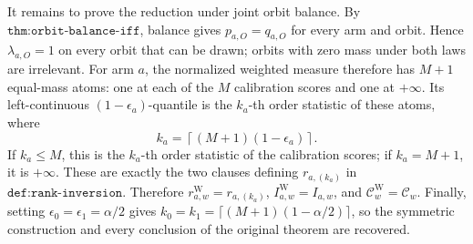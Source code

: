 It remains to prove the reduction under joint orbit balance. By \(\texttt{thm:orbit-balance-iff}\), balance gives \(p_{a,O}=q_{a,O}\) for every arm and orbit. Hence \(\lambda_{a,O}=1\) on every orbit that can be drawn; orbits with zero mass under both laws are irrelevant. For arm \(a\), the normalized weighted measure therefore has \(M+1\) equal-mass atoms: one at each of the \(M\) calibration scores and one at \(+\infty\). Its left-continuous \((1-\epsilon_a)\)-quantile is the \(k_a\)-th order statistic of these atoms, where
\[
k_a=\left\lceil(M+1)(1-\epsilon_a)\right\rceil.
\]
If \(k_a\le M\), this is the \(k_a\)-th order statistic of the calibration scores; if \(k_a=M+1\), it is \(+\infty\). These are exactly the two clauses defining \(r_{a,(k_a)}\) in \(\texttt{def:rank-inversion}\). Therefore \(r^{\mathrm W}_{a,w}=r_{a,(k_a)}\), \(I^{\mathrm W}_{a,w}=I_{a,w}\), and \(\mathcal C^{\mathrm W}_w=\mathcal C_w\). Finally, setting \(\epsilon_0=\epsilon_1=\alpha/2\) gives \(k_0=k_1=\lceil(M+1)(1-\alpha/2)\rceil\), so the symmetric construction and every conclusion of the original theorem are recovered.
